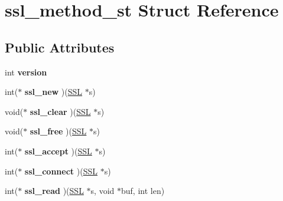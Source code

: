 \hypertarget{structssl__method__st}{}\section{ssl\+\_\+method\+\_\+st Struct Reference}
\label{structssl__method__st}
\subsection*{Public Attributes}
\begin{DoxyCompactItemize}
\item 
\mbox{\label{structssl__method__st_a1d231051899c943c03267d9ede6d2488}} 
int {\bfseries version}
\item 
\mbox{\label{structssl__method__st_a7a5b5fc62a1f2d1e130bb67f5da66a81}} 
int($\ast$ {\bfseries ssl\+\_\+new} )(\hyperlink{structssl__st}{S\+SL} $\ast$s)
\item 
\mbox{\label{structssl__method__st_ae1a1f21bb25134669738357096bfd629}} 
void($\ast$ {\bfseries ssl\+\_\+clear} )(\hyperlink{structssl__st}{S\+SL} $\ast$s)
\item 
\mbox{\label{structssl__method__st_a8df364610bd0f741b9fe078a69d88e28}} 
void($\ast$ {\bfseries ssl\+\_\+free} )(\hyperlink{structssl__st}{S\+SL} $\ast$s)
\item 
\mbox{\label{structssl__method__st_a414ff7e2c280fb8e5cee22bff2df8717}} 
int($\ast$ {\bfseries ssl\+\_\+accept} )(\hyperlink{structssl__st}{S\+SL} $\ast$s)
\item 
\mbox{\label{structssl__method__st_acfec7986091a9749de81345a3833b595}} 
int($\ast$ {\bfseries ssl\+\_\+connect} )(\hyperlink{structssl__st}{S\+SL} $\ast$s)
\item 
\mbox{\label{structssl__method__st_a113246b4c830059207f54935b8874289}} 
int($\ast$ {\bfseries ssl\+\_\+read} )(\hyperlink{structssl__st}{S\+SL} $\ast$s, void $\ast$buf, int len)
\item 
\mbox{\label{structssl__method__st_a4216ad37e9a089392b0fe1915ed745d7}} 

\end{DoxyCompactItemize}
